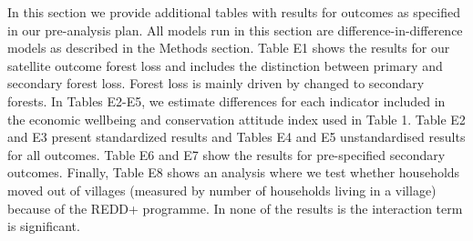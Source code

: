 \documentclass[
]{article}
\begin{document}
In this section we provide additional tables with results for outcomes
as specified in our pre-analysis plan. All models run in this section
are difference-in-difference models as described in the Methods section.
Table E1 shows the results for our satellite outcome forest loss and
includes the distinction between primary and secondary forest loss.
Forest loss is mainly driven by changed to secondary forests. In Tables
E2-E5, we estimate differences for each indicator included in the
economic wellbeing and conservation attitude index used in Table 1.
Table E2 and E3 present standardized results and Tables E4 and E5
unstandardised results for all outcomes. Table E6 and E7 show the
results for pre-specified secondary outcomes. Finally, Table E8 shows an
analysis where we test whether households moved out of villages
(measured by number of households living in a village) because of the
REDD+ programme. In none of the results is the interaction term is
significant.
\end{document}
